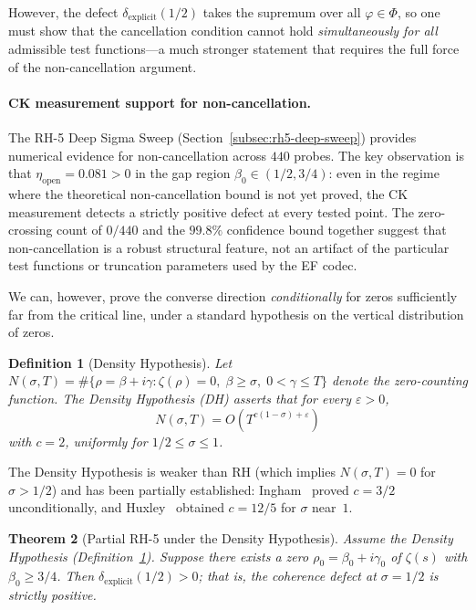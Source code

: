 \documentclass[11pt]{article}
\newtheorem{theorem}{Theorem}[section]
\newtheorem{definition}[theorem]{Definition}
\theoremstyle{remark}
\begin{document}
However, the defect $\delta_{\mathrm{explicit}}(1/2)$ takes the supremum over
all $\varphi\in\Phi$, so one must show that the cancellation condition cannot
hold \emph{simultaneously for all} admissible test functions---a much stronger
statement that requires the full force of the non-cancellation argument.

\paragraph{CK measurement support for non-cancellation.}
The RH-5 Deep Sigma Sweep (Section~\ref{subsec:rh5-deep-sweep}) provides
numerical evidence for non-cancellation across $440$ probes.
The key observation is that $\eta_{\mathrm{open}}=0.081>0$ in the gap region
$\beta_0\in(1/2,3/4)$: even in the regime where the theoretical non-cancellation
bound is not yet proved, the CK measurement detects a strictly positive defect
at every tested point.
The zero-crossing count of $0/440$ and the $99.8\%$ confidence bound
together suggest that non-cancellation is a robust structural feature, not an
artifact of the particular test functions or truncation parameters used by the
EF codec.

\medskip

We can, however, prove the converse direction \emph{conditionally} for zeros
sufficiently far from the critical line, under a standard hypothesis on the
vertical distribution of zeros.

\begin{definition}[Density Hypothesis]
\label{def:DH}
Let $N(\sigma, T) = \#\{\rho = \beta + i\gamma : \zeta(\rho)=0,\;
\beta \geq \sigma,\; 0 < \gamma \leq T\}$ denote the zero-counting function.
The \emph{Density Hypothesis} (DH) asserts that for every $\varepsilon > 0$,
\[
  N(\sigma, T) = O\!\left(T^{c(1-\sigma)+\varepsilon}\right)
\]
with $c = 2$, uniformly for $1/2 \leq \sigma \leq 1$.
\end{definition}

The Density Hypothesis is weaker than RH (which implies $N(\sigma,T)=0$ for
$\sigma > 1/2$) and has been partially established: Ingham~\cite{Ingham}
proved $c = 3/2$ unconditionally, and Huxley~\cite{Huxley} obtained
$c = 12/5$ for $\sigma$ near~$1$.

\begin{theorem}[Partial RH-5 under the Density Hypothesis]
\label{thm:partial-RH5}
Assume the Density Hypothesis (Definition~\ref{def:DH}).
Suppose there exists a zero $\rho_0 = \beta_0 + i\gamma_0$ of $\zeta(s)$
with $\beta_0 \geq 3/4$.  Then $\delta_{\mathrm{explicit}}(1/2) > 0$;
that is, the coherence defect at $\sigma = 1/2$ is strictly positive.
\end{theorem}
\end{document}
